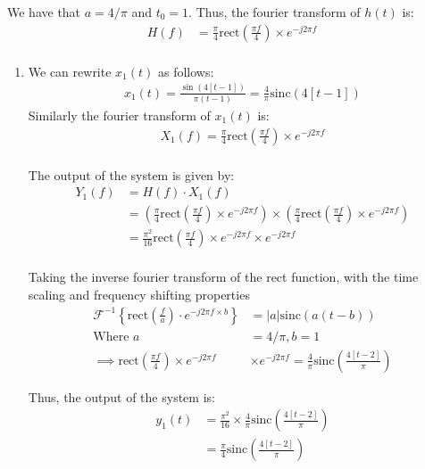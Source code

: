 \documentclass{article}
\begin{document}
We have that $a = 4/\pi$ and $t_0 = 1$. Thus, the fourier transform of $h(t)$ is:
\begin{align*}
    H(f) &= \frac{\pi}{4} \text{rect}\left(\frac{\pi f}{4}\right) \times e^{-j2\pi f} \\
\end{align*}


\begin{enumerate}[label=2.\arabic*]
    \item We can rewrite $x_1(t)$ as follows:
    \begin{align*}
        x_1(t) = \frac{\sin(4[t-1])}{\pi(t-1)} = \frac{4}{\pi} \text{sinc}(4[t-1])
    \end{align*}
    Similarly the fourier transform of $x_1(t)$ is:
    \begin{align*}
        X_1(f) = \frac{\pi}{4} \text{rect}\left(\frac{\pi f}{4}\right) \times e^{-j2\pi f} \\
    \end{align*}

    The output of the system is given by:
    \begin{align*}
        Y_1(f) &= H(f) \cdot X_1(f) \\
        &= \left(\frac{\pi}{4} \text{rect}\left(\frac{\pi f}{4}\right) \times e^{-j2\pi f}\right) \times \left(\frac{\pi}{4} \text{rect}\left(\frac{\pi f}{4}\right) \times e^{-j2\pi f}\right) \\
        &= \frac{\pi^2}{16} \text{rect}\left(\frac{\pi f}{4}\right) \times e^{-j2\pi f} \times e^{-j2\pi f} \\
    \end{align*}

    Taking the inverse fourier transform of the rect function, with the time scaling and frequency shifting properties
    \begin{align*}
        \mathcal{F}^{-1}\left\{\text{rect}\left(\frac{f}{a}\right) \cdot e^{-j2\pi f \times b}\right\} &= |a| \text{sinc}(a(t-b)) \\
        \text{Where } a &= 4/\pi, b = 1 \\
        \implies \text{rect}\left(\frac{\pi f}{4}\right) \times e^{-j2\pi f} &\times e^{-j2\pi f} = \frac{4}{\pi} \text{sinc}\left(\frac{4[t-2]}{\pi}\right)
    \end{align*}

    Thus, the output of the system is:
    \begin{align*}
        y_1(t) &= \frac{\pi^2}{16} \times \frac{4}{\pi} \text{sinc}\left(\frac{4[t-2]}{\pi}\right) \\
        &= \boxed{\frac{\pi}{4} \text{sinc}\left(\frac{4[t-2]}{\pi}\right)}
    \end{align*}


\end{enumerate}
\end{document}
